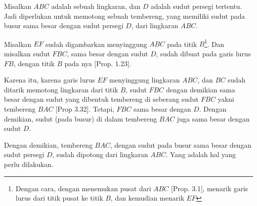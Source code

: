 \documentclass[a4paper]{book}
\begin{document}
Misalkan $ABC$ adalah sebuah lingkaran, dan $D$ adalah sudut persegi tertentu.
Jadi diperlukan untuk memotong sebuah tembereng, yang memiliki sudut pada busur
sama besar dengan sudut persegi $D$, dari lingkaran $ABC$.

Misalkan $EF$ sudah digambarkan menyinggung $ABC$ pada titik $B$\footnote{Dengan 
cara, dengan menemukan pusat dari $ABC$ [Prop. 3.1], menarik garis lurus dari titik
pusat ke titik $B$, dan kemudian menarik $EF$}. Dan misalkan sudut
$FBC$, sama besar dengan sudut $D$, sudah dibuat pada garis lurus $FB$, dengan titik
$B$ pada nya [Prop. 1.23].

Karena itu, karena garis lurus $EF$ menyinggung lingkaran $ABC$, dan $BC$ sudah
ditarik memotong lingkaran dari titik $B$, sudut $FBC$ dengan demikian sama besar
dengan sudut yang dibentuk tembereng di seberang sudut $FBC$ yakni 
tembereng $BAC$ [Prop 3.32]. Tetapi, $FBC$ sama besar dengan $D$. Dengan demikian, 
sudut (pada busur) di dalam tembereng $BAC$ juga sama besar dengan sudut $D$.

Dengan demikian, tembereng $BAC$, dengan sudut pada busur sama besar dengan sudut
persegi $D$, sudah dipotong dari lingkaran $ABC$. Yang adalah hal yang perlu
dilakukan.

\end{document}
